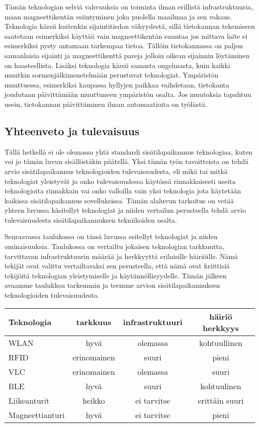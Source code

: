 Tämän teknologian selviä vahvuuksia on toiminta ilman erillistä infrastruktuuria, maan magneettikentän esiintyminen joka puolella maailmaa ja sen vakaus\cite{magneetti}. Teknologia kärsii kuitenkin sijaintitiedon vähyydestä, sillä tietokannan tekemiseen saatetaan esimerkiksi käyttää vain magneettikentän suuntaa jos mittava laite ei esimerkiksi pysty antamaan tarkempaa tietoa\cite{magneetti}. Tällöin tietokannassa on paljon samanlaisia sijainti ja magneettikenttä pareja jolloin oikean sijainnin löytäminen on haasteellista. Lisäksi teknologia kärsii samasta ongelmasta, kuin kaikki muutkin sormenjälkimenetelmään perustuvat teknologiat. Ympäristön muuttuessa, esimerkiksi kaupassa hyllyjen paikkaa vaihdetaan, tietokanta joudutaan päivittämään muuttuneen ympäristön osalta. Jos muutoksia tapahtuu usein, tietokannan päivittäminen ilman automaatioita on työlästä.

\subsection{Yhteenveto ja tulevaisuus}
Tällä hetkellä ei ole olemassa yhtä standardi sisätilapaikannus teknologiaa, kuten voi jo tämän luvun sisällöstäkin päätellä. Yksi tämän työn tavoitteista on tehdä arvio sisätilapaikannus teknologioiden tulevaisuudesta, eli mikä tai mitkä teknologiat yleistyvät ja onko tulevaisuudessa käytössä rinnakkaisesti useita teknologioita rinnakkain vai onko valloilla vain yksi teknologia jota käytetään kaikissa sisätilapaikannus sovelluksissa. Tämän alaluvun tarkoitus on vetää yhteen luvussa käsitellyt teknologiat ja niiden vertailun perusteella tehdä arvio tulevaisuudesta sisätilapaikannuksen tekniikoiden osalta.

Seuraavassa taulukossa on tässä luvussa esitellyt teknologiat ja niiden ominaisuuksia. Taulukossa on vertailtu jokaisen teknologian tarkkuutta, tarvittavan infrastruktuurin määrää ja herkkyyttä erilaisille häiriöille. Nämä tekijät ovat valittu vertailtavaksi sen perusteella, että nämä ovat kriittisiä tekijöitä teknologian yleistymiselle ja käytännöllisyydelle. Tämän jälkeen avaamme taulukkoa tarkemmin ja teemme arvion sisätilapaikannuksen teknologioiden tulevaisuudesta.
\begin{center}
\begin{tabular}{| l || c | c | c| }
\hline
Teknologia & tarkkuus & infrastruktuuri & häiriö herkkyys\\ \hline\hline
WLAN & hyvä & olemassa & kohtuullinen\\ \hline
RFID & erinomainen & suuri & pieni\\ \hline
VLC & erinomainen & olemassa & suuri\\ \hline
BLE & hyvä & suuri & kohtuulinen\\ \hline
Liikeanturit & heikko & ei tarvitse & erittäin suuri\\ \hline
Magneettianturi & hyvä & ei tarvitse & pieni\\
\hline
\end{tabular}
\end{center}

